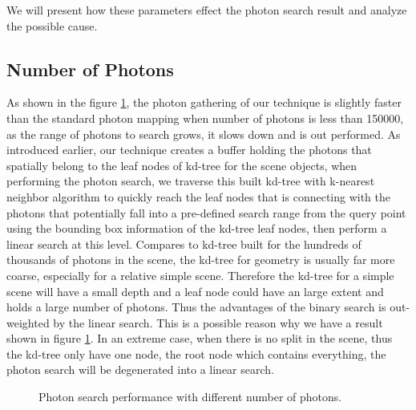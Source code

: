 We will present how these parameters effect the photon search result and analyze the possible cause. 

\subsection{Number of Photons} 

As shown in the figure \ref{fig:photon_search_1}, the photon gathering of our technique is slightly faster than the standard photon mapping when number of photons is less than 150000, as the range of photons to search grows, it slows down and is out performed. As introduced earlier, our technique creates a buffer holding the photons that spatially belong to the leaf nodes of kd-tree for the scene objects, when performing the photon search, we traverse this built kd-tree with k-nearest neighbor algorithm to quickly reach the leaf nodes that is connecting with the photons that potentially fall into a pre-defined search range from the query point using the bounding box information of the kd-tree leaf nodes, then perform a linear search at this level. Compares to kd-tree built for the hundreds of thousands of photons in the scene, the kd-tree for geometry is usually far more coarse, especially for a relative simple scene. Therefore the kd-tree for a simple scene will have a small depth and a leaf node could have an large extent and holds a large number of photons. Thus the advantages of the binary search is out-weighted by the linear search. This is a possible reason why we have a result shown in figure \ref{fig:photon_search_1}. In an extreme case, when there is no split in the scene, thus the kd-tree only have one node, the root node which contains everything, the photon search will be degenerated into a linear search. 

\begin{figure}[ftp] 
    \centering 
    \caption[]{Photon search performance with different number of photons. }
    \label{fig:photon_search_1}  
\end{figure} 

